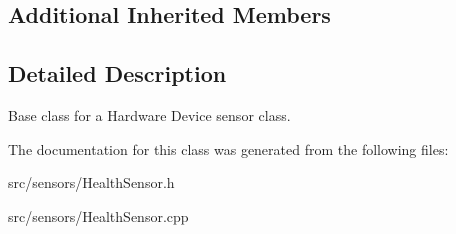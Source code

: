 \subsection*{Additional Inherited Members}


\subsection{Detailed Description}
Base class for a Hardware Device sensor class. 

The documentation for this class was generated from the following files\+:\begin{DoxyCompactItemize}
\item 
src/sensors/Health\+Sensor.\+h\item 
src/sensors/Health\+Sensor.\+cpp\end{DoxyCompactItemize}
